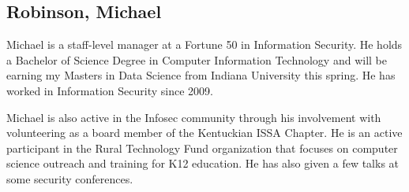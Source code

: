 \subsection{Robinson, Michael}

Michael is a staff-level manager at a Fortune 50 in Information
Security. He holds a Bachelor of Science Degree in Computer
Information Technology and will be earning my Masters in Data Science
from Indiana University this spring. He has worked in Information
Security since 2009.

Michael is also active in the Infosec community through his
involvement with volunteering as a board member of the Kentuckian ISSA
Chapter. He is an active participant in the Rural Technology Fund
organization that focuses on computer science outreach and training
for K12 education. He has also given a few talks at some security
conferences.
